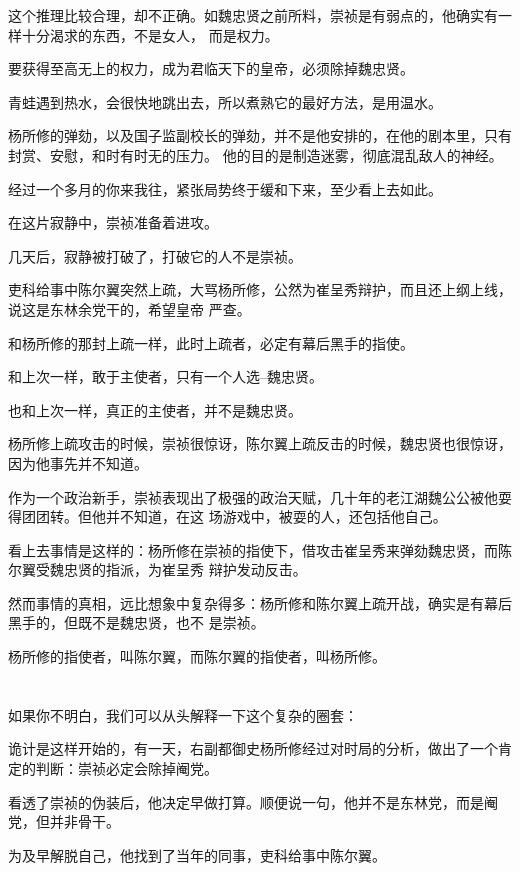 \documentclass[11pt,a4paper,onecolumn]{article}
\begin{document}
这个推理比较合理，却不正确。如魏忠贤之前所料，崇祯是有弱点的，他确实有一样十分渴求的东西，不是女人，
而是权力。

要获得至高无上的权力，成为君临天下的皇帝，必须除掉魏忠贤。

青蛙遇到热水，会很快地跳出去，所以煮熟它的最好方法，是用温水。

杨所修的弹劾，以及国子监副校长的弹劾，并不是他安排的，在他的剧本里，只有封赏、安慰，和时有时无的压力。
他的目的是制造迷雾，彻底混乱敌人的神经。

经过一个多月的你来我往，紧张局势终于缓和下来，至少看上去如此。

在这片寂静中，崇祯准备着进攻。

几天后，寂静被打破了，打破它的人不是崇祯。

吏科给事中陈尔翼突然上疏，大骂杨所修，公然为崔呈秀辩护，而且还上纲上线，说这是东林余党干的，希望皇帝
严查。

和杨所修的那封上疏一样，此时上疏者，必定有幕后黑手的指使。

和上次一样，敢于主使者，只有一个人选--魏忠贤。

也和上次一样，真正的主使者，并不是魏忠贤。

杨所修上疏攻击的时候，崇祯很惊讶，陈尔翼上疏反击的时候，魏忠贤也很惊讶，因为他事先并不知道。

作为一个政治新手，崇祯表现出了极强的政治天赋，几十年的老江湖魏公公被他耍得团团转。但他并不知道，在这
场游戏中，被耍的人，还包括他自己。

看上去事情是这样的：杨所修在崇祯的指使下，借攻击崔呈秀来弹劾魏忠贤，而陈尔翼受魏忠贤的指派，为崔呈秀
辩护发动反击。

然而事情的真相，远比想象中复杂得多：杨所修和陈尔翼上疏开战，确实是有幕后黑手的，但既不是魏忠贤，也不
是崇祯。

杨所修的指使者，叫陈尔翼，而陈尔翼的指使者，叫杨所修。

\section[\thesection]{}

如果你不明白，我们可以从头解释一下这个复杂的圈套：

诡计是这样开始的，有一天，右副都御史杨所修经过对时局的分析，做出了一个肯定的判断：崇祯必定会除掉阉党。

看透了崇祯的伪装后，他决定早做打算。顺便说一句，他并不是东林党，而是阉党，但并非骨干。

为及早解脱自己，他找到了当年的同事，吏科给事中陈尔翼。
\end{document}
